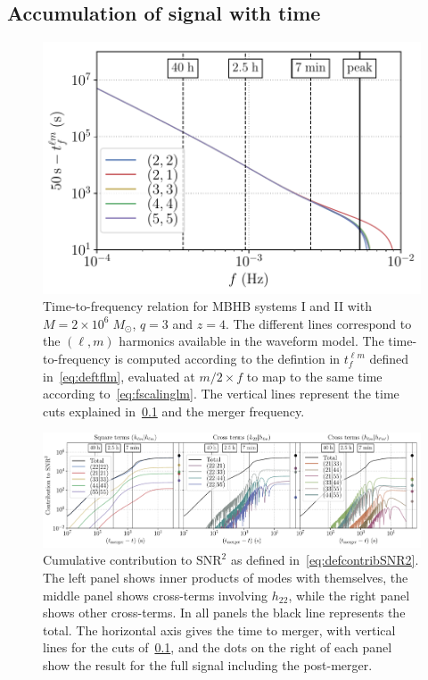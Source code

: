 \documentclass[aps,showpacs,twocolumn,prd,superscriptaddress,nofootinbib]{revtex4-1}
\begin{document}

\subsection{Accumulation of signal with time}
\label{subsec:MBHBacctime}

\begin{figure}
   \includegraphics[width=.99\linewidth]{../plots/tflm_smbh.pdf}
  \caption{Time-to-frequency relation for MBHB systems I and II with $M=2\times 10^6 \; M_{\odot}$, $q=3$ and $z=4$. The different lines correspond to the $(\ell, m)$ harmonics available in the waveform model. The time-to-frequency is computed according to the defintion in $t_{f}^{\ell m}$ defined in~\eqref{eq:deftflm}, evaluated at $m/2 \times f$ to map to the same time according to~\eqref{eq:fscalinglm}. The vertical lines represent the time cuts explained in~\ref{subsec:MBHBacctime} and the merger frequency.}
  \label{fig:t-f-relation-lm}
\end{figure}

\begin{figure}
  \centering
  \includegraphics[width=.98\linewidth]{../plots/overlapmodebymode_maxfscaledlm_t.pdf}
  \caption{Cumulative contribution to $\mathrm{SNR}^{2}$ as defined in~\eqref{eq:defcontribSNR2}. The left panel shows inner products of modes with themselves, the middle panel shows cross-terms involving $h_{22}$, while the right panel shows other cross-terms. In all panels the black line represents the total. The horizontal axis gives the time to merger, with vertical lines for the cuts of~\ref{subsec:MBHBacctime}, and the dots on the right of each panel show the result for the full signal including the post-merger.}
  \label{fig:modeoverlapsoftime}
\end{figure}
\end{document}
